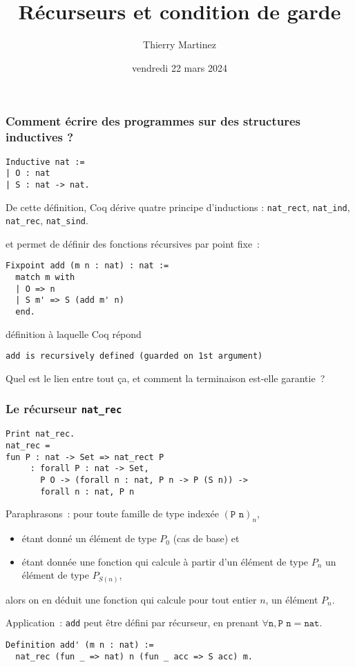 \documentclass{beamer}
\begin{document}
\begin{frame}
  \title{Récurseurs et condition de garde}
  \author{Thierry Martinez}
  \date{vendredi 22 mars 2024}
  \maketitle
\end{frame}
\begin{frame}[fragile]
  \frametitle{Comment écrire des programmes sur des structures inductives ?}

\begin{verbatim}
Inductive nat :=
| O : nat
| S : nat -> nat.
\end{verbatim}

\vfill

De cette définition, Coq dérive quatre principe d'inductions :
\texttt{nat_rect},
\texttt{nat_ind},
\texttt{nat_rec},
\texttt{nat_sind}.

\vfill

et permet de définir des fonctions récursives par point fixe :

\begin{verbatim}
Fixpoint add (m n : nat) : nat :=
  match m with
  | O => n
  | S m' => S (add m' n)
  end.
\end{verbatim}

définition à laquelle Coq répond

\texttt{add is recursively defined (guarded on 1st argument)}

Quel est le lien entre tout ça, et comment la terminaison est-elle garantie ?

\end{frame}
\begin{frame}[fragile]
  \frametitle{Le récurseur \texttt{nat_rec}}

\begin{verbatim}
Print nat_rec.
nat_rec =
fun P : nat -> Set => nat_rect P
     : forall P : nat -> Set,
       P O -> (forall n : nat, P n -> P (S n)) ->
       forall n : nat, P n
\end{verbatim}

\vfill

Paraphrasons : pour toute famille de type indexée \((\texttt{P n})_n\),
\begin{itemize}
\item étant donné un élément de type \(P_0\) (cas de base) et
\item étant donnée une fonction qui calcule à partir d’un élément de type \(P_n\) un élément de type \(P_{S(n)}\),
\end{itemize}
alors on en déduit une fonction qui calcule pour tout entier \(n\), un élément \(P_n\).

\vfill

Application : \texttt{add} peut être défini par récurseur, en prenant \(\forall \texttt{n}, \texttt{P n} = \texttt{nat}\).

\begin{verbatim}
Definition add' (m n : nat) :=
  nat_rec (fun _ => nat) n (fun _ acc => S acc) m.
\end{verbatim}
\end{frame}
\end{document}
